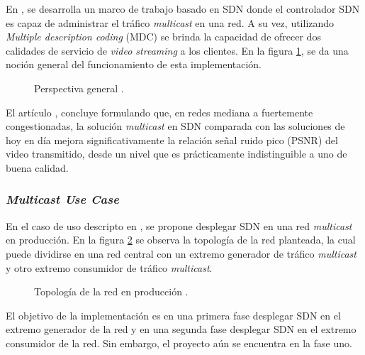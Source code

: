 En \parencite{paper_streaming_multicast}, se desarrolla un marco de trabajo basado en SDN donde el controlador SDN es capaz de administrar el tráfico \textit{multicast} en una red. A su vez, utilizando \textit{Multiple description coding} (MDC) se brinda la capacidad de ofrecer dos calidades de servicio de \textit{video streaming} a los clientes. En la figura \ref{fig:paper_streaming_multicast}, se da una noción general del funcionamiento de esta implementación.

\begin{figure}[th]
	\centering 
	\caption[Perspectiva general.]{Perspectiva general \parencite{paper_streaming_multicast}.}
	\label{fig:paper_streaming_multicast}
\end{figure}

El artículo \parencite{paper_streaming_multicast}, concluye formulando que, en redes mediana a fuertemente congestionadas, la solución \textit{multicast} en SDN comparada con las soluciones de hoy en día mejora significativamente la relación señal ruido pico (PSNR) del video transmitido, desde un nivel que es prácticamente indistinguible a uno de buena calidad.   

\subsubsection*{\textit{Multicast Use Case}}

En el caso de uso descripto en \parencite{mcast_ONOS_use_case}, se propone desplegar SDN en una red \textit{multicast} en producción. En la figura \ref{fig:mcast_ONOS_use_case} se observa la topología de la red planteada, la cual puede dividirse en una red central con un extremo generador de tráfico \textit{multicast} y otro extremo consumidor de tráfico \textit{multicast}.

\begin{figure}[th]
	\centering 
	\caption[Topología de la red en producción.]{Topología de la red en producción \parencite{mcast_ONOS_use_case}.}
	\label{fig:mcast_ONOS_use_case}
\end{figure}

El objetivo de la implementación \parencite{mcast_ONOS_use_case} es en una primera fase desplegar SDN en el extremo generador de la red y en una segunda fase desplegar SDN en el extremo consumidor de la red. Sin embargo, el proyecto aún se encuentra en la fase uno.

